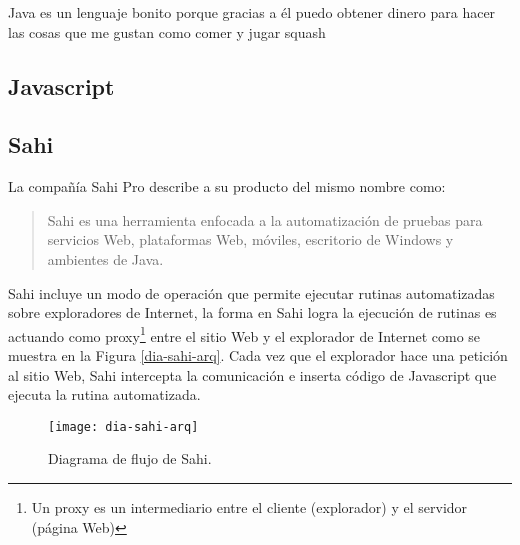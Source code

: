 Java es un lenguaje bonito porque gracias a él  puedo obtener dinero para hacer las cosas que me gustan como comer  y jugar squash

\subsection{Javascript}\label{sec-javascript}
\fi


\subsection{Sahi}\label{sec-sahi}
La compañía Sahi Pro\textsuperscript{\textcopyright}\cite{SahiPro} describe a su producto del mismo nombre como:
\begin{quote}
	Sahi es una herramienta enfocada a la automatización de pruebas para servicios Web, plataformas Web, móviles, escritorio de Windows\textsuperscript{\textcopyright} y ambientes de Java.
\end{quote}

Sahi incluye un modo de operación que permite ejecutar rutinas automatizadas sobre exploradores de Internet, la forma en Sahi logra la ejecución de rutinas es actuando como proxy\footnote{Un proxy es un intermediario entre el cliente (explorador) y el servidor (página Web)\cite{BeginningUbuntuLinux}} entre el sitio Web y el explorador de Internet como se muestra en la Figura \ref{dia-sahi-arq}. Cada vez que el explorador hace una petición al sitio Web, Sahi intercepta la comunicación e inserta código de Javascript que ejecuta la rutina automatizada.\cite{WebEng9IntConf, SahiPro}

\begin{figure}[h]
\centering
\texttt{[image: dia-sahi-arq]}
\caption{Diagrama de flujo de Sahi\cite{SahiPro}.}
\label{fig:dia-sahi-arq}
\end{figure}

